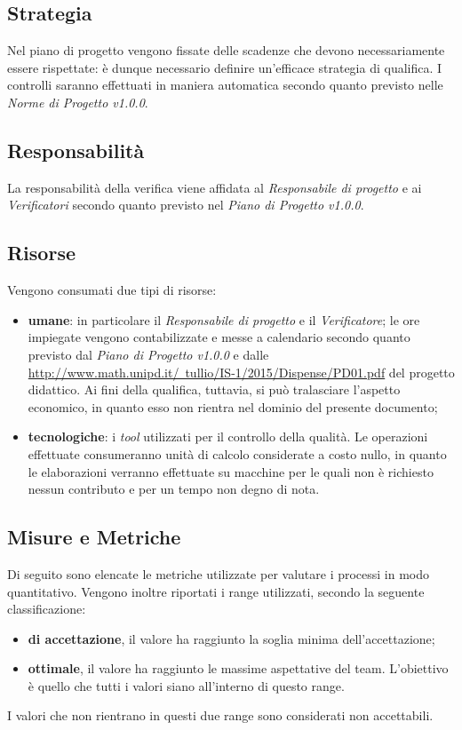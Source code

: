 \subsection{Strategia}
Nel piano di progetto vengono fissate delle scadenze che devono necessariamente essere rispettate: \`e dunque necessario definire un'efficace strategia di qualifica. I controlli saranno effettuati in maniera automatica secondo quanto previsto nelle \textit{Norme di Progetto v1.0.0}. 

\subsection{Responsabilit\`a}
La responsabilit\`a della verifica viene affidata al \textit{Responsabile di progetto} e ai \textit{Verificatori} secondo quanto previsto nel \textit{Piano di Progetto v1.0.0}.

\subsection{Risorse}
Vengono consumati due tipi di risorse:
\begin{itemize}
	\item \textbf{umane}: in particolare il \textit{Responsabile di progetto} e il \textit{Verificatore}; le ore impiegate vengono contabilizzate e messe a calendario secondo quanto previsto dal \textit{Piano di Progetto v1.0.0} e dalle \href{regole}{http://www.math.unipd.it/~tullio/IS-1/2015/Dispense/PD01.pdf} del progetto didattico. Ai fini della qualifica, tuttavia, si pu\`o tralasciare l'aspetto economico, in quanto esso non rientra nel dominio del presente documento;
		\item \textbf{tecnologiche}: i \textit{tool} utilizzati per il controllo della qualit\`a. Le operazioni effettuate  consumeranno unit\`a di calcolo considerate a costo nullo, in quanto le elaborazioni verranno effettuate su macchine per le quali non \`e richiesto nessun contributo e per un tempo non degno di nota.
\end{itemize}

\subsection{Misure e Metriche}
Di seguito sono elencate le metriche utilizzate per valutare i processi in modo quantitativo. Vengono inoltre riportati i range utilizzati, secondo la seguente classificazione:
\begin{itemize}
	\item \textbf{di accettazione}, il valore ha raggiunto la soglia minima dell'accettazione;
	\item \textbf{ottimale}, il valore ha raggiunto le massime aspettative del team. L'obiettivo \`e quello che tutti i valori siano all'interno di questo range.
\end{itemize}
I valori che non rientrano in questi due range sono considerati non accettabili.

